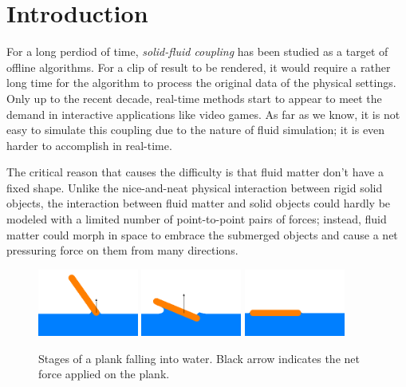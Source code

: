 \section{Introduction}

For a long perdiod of time, \emph{solid-fluid coupling} has been studied as a target of offline algorithms.
For a clip of result to be rendered, it would require a rather long time for the algorithm to process the original data of the physical settings.
Only up to the recent decade, real-time methods start to appear to meet the demand in interactive applications like video games.
As far as we know, it is not easy to simulate this coupling due to the nature of fluid simulation;
it is even harder to accomplish in real-time.

The critical reason that causes the difficulty is that fluid matter don't have a fixed shape.
Unlike the nice-and-neat physical interaction between rigid solid objects, the interaction between fluid matter and solid objects could hardly be modeled with a limited number of point-to-point pairs of forces;
instead, fluid matter could morph in space to embrace the submerged objects and cause a net pressuring force on them from many directions.

\begin{figure}[h]
	\begin{center}
		\includegraphics[width=1.3in]{figures/stages-of-a-plank-falling-into-water/1.png}
		\includegraphics[width=1.3in]{figures/stages-of-a-plank-falling-into-water/2.png}
		\includegraphics[width=1.3in]{figures/stages-of-a-plank-falling-into-water/3.png}
	\end{center}
	\caption{
		Stages of a plank falling into water.
		Black arrow indicates the net force applied on the plank.
	}
	\label{stages-of-a-plank-falling-into-water}
\end{figure}

